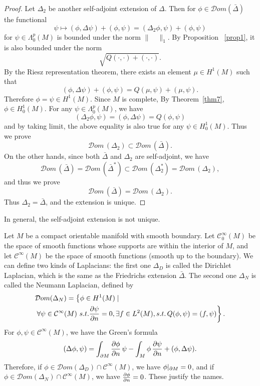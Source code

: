 \begin{proof}
Let $\Delta_2$ be another self-adjoint extension of $\Delta$. Then for $\phi\in {\mathcal Dom}(\bar\Delta)$ the functional 
\[
\psi\mapsto(\phi,\Delta\psi)+(\phi,\psi)=(\Delta_2\phi,\psi)+(\phi,\psi)
\]
for $\psi\in\Lambda_0^p(M)$ is bounded under the norm $\|\quad\|_1$. By Proposition ~\ref{prop1}, it is also bounded under the norm
\[
\sqrt{Q(\cdot,\cdot)+(\cdot,\cdot)}.
\]
By the Riesz representation theorem, there exists an element $\mu\in H^1(M)$ such that 
\[
(\phi,\Delta\psi)+(\phi,\psi)=Q(\mu,\psi)+(\mu,\psi).
\]
Therefore $\phi=\psi\in H^1(M)$. Since $M$ is complete, By Theorem~\ref{thm7}, $\phi\in H_0^1(M)$. For any $\psi\in\Lambda_0^p(M)$, we have
\[
(\Delta_2\phi,\psi)=(\phi,\Delta\psi)=Q(\phi,\psi)
\]
and by taking limit, the above equality is also true for any $\psi\in H_0^1(M)$. Thus we prove
\[
{\mathcal Dom}\,(\Delta_2)\subset {\mathcal Dom}\,(\bar\Delta).
\]
On the other hands, since both $\bar\Delta$ and $\Delta_2$ are self-adjoint, we have
\[
{\mathcal Dom}\,(\bar\Delta)={\mathcal Dom}\,(\bar\Delta^*)\subset{\mathcal Dom}\,(\Delta_2^*)={\mathcal Dom}\,(\Delta_2),
\]
and thus we prove 
\[
{\mathcal Dom}\,(\bar\Delta)={\mathcal Dom}\,(\Delta_2).
\]
Thus $\Delta_2=\bar\Delta$, and the extension is unique. 


\end{proof}

In general, the self-adjoint extension is not unique.

\begin{example} Let $M$ be a compact orientable manifold with smooth boundary. Let $\mathcal C_0^\infty(M)$ be the space of smooth functions whose supports are within the interior of $M$, and let $\mathcal C^\infty(M)$ be the space of smooth functions (smooth up to the boundary). 
We can define two kinds of Laplacians: the first one $\Delta_D$  is called the Dirichlet Laplacian, which is the same as the Friedrichs extension $\bar\Delta$. The second one $\Delta_N$ is called the Neumann Laplacian, defined by
\begin{align*}
&
{\mathcal Dom}(\Delta_N)=\left\{\phi\in H^1(M)\mid\right.\\
&\left.\forall\psi\in \mathcal C^\infty(M) \,\,s.t. \frac{\partial\psi}{\partial n}=0, \exists f\in L^2(M), s.t.\, Q(\phi,\psi)=( f,\psi)\right\}.
\end{align*}
For $\phi,\psi\in \mathcal C^\infty(M)$, we have the Green's formula
\[
(\Delta\phi,\psi)=\int_{\partial M}\frac{\partial\phi}{\partial n}\,\psi-\int_M\phi\,\frac{\partial\psi}{\partial n}+(\phi,\Delta\psi).
\]
Therefore, if $\phi\in {\mathcal Dom}(\Delta_D)\cap\mathcal C^\infty(M)$, we have $\phi|_{\partial M}=0$, and if
$\phi\in{\mathcal Dom}(\Delta_N)\cap \mathcal C^\infty(M)$, we have $\frac{\partial\phi}{\partial n}=0$. These justify the names.

\end{example}


